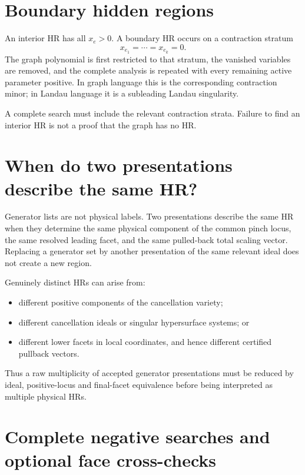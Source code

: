 \documentclass[a4paper,11pt]{article}
\begin{document}
\section{Boundary hidden regions}
\label{sec:boundary}

An interior HR has all \(x_e>0\).  A boundary HR occurs on a contraction
stratum
\begin{equation}
 x_{e_1}=\cdots=x_{e_k}=0.
\end{equation}
The graph polynomial is first restricted to that stratum, the vanished
variables are removed, and the complete analysis is repeated with every
remaining active parameter positive.  In graph language this is the
corresponding contraction minor; in Landau language it is a subleading
Landau singularity.

A complete search must include the relevant contraction strata.  Failure to
find an interior HR is not a proof that the graph has no HR.

\section{When do two presentations describe the same HR?}
\label{sec:equivalence}

Generator lists are not physical labels.  Two presentations describe the
same HR when they determine the same physical component of the common pinch
locus, the same resolved leading facet, and the same pulled-back total
scaling vector.  Replacing a generator set by another presentation of the
same relevant ideal does not create a new region.

Genuinely distinct HRs can arise from:
\begin{itemize}
\item different positive components of the cancellation variety;
\item different cancellation ideals or singular hypersurface systems; or
\item different lower facets in local coordinates, and hence different
      certified pullback vectors.
\end{itemize}
Thus a raw multiplicity of accepted generator presentations must be reduced
by ideal, positive-locus and final-facet equivalence before being interpreted
as multiple physical HRs.

\section{Complete negative searches and optional face cross-checks}
\label{sec:absence}
\end{document}

